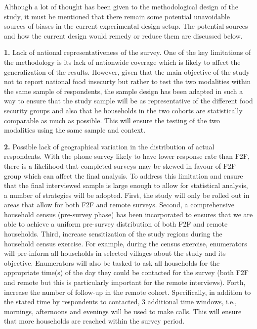 \documentclass[11pt,harvard]{article}
\begin{document}
	Although a lot of thought has been given to the methodological design of the study, it must be mentioned that there remain some potential unavoidable sources of biases in the current experimental design setup. The potential sources and how the current design would remedy or reduce them are discussed below. 
	
	\textbf{1.} Lack of national representativeness of the survey. One of the key limitations of the methodology is its lack of nationwide coverage which is likely to affect the generalization of the results. However, given that the main objective of the study not to report national food insecurty but rather to test the two modalities within the same sample of respondents, the sample design has been adapted in such a way to ensure that the study sample will be as representative of the different food security groups and also that he households in the two cohorts are statistically comparable as much as possible. This will ensure the testing of the two modalities using the same sample and context.
	
	\textbf{2.} Possible lack of geographical variation in the distribution of actual respondents. With the phone survey likely to have lower response rate than F2F, there is a likelihood that completed surveys may be skewed in favour of F2F group which can affect the final analysis. To address this limitation and ensure that the final interviewed sample is large enough to allow for statistical analysis, a number of strategies will be adopted. First, the study will only be rolled out in areas that allow for both F2F and remote surveys. Second, a comprehensive household census (pre-survey phase) has been incorporated to ensures that we are able to achieve a uniform pre-survey distribution of both F2F and remote households. Third, increase sensitization of the study regions during the household census exercise. For example, during the census exercise, enumerators will pre-inform all households in selected villages about the study and its objective. Enumerators will also be tasked to ask all households for the appropriate time(s) of the day they could be contacted for the survey (both F2F and remote but this is particularly important for the remote interviews). Forth, increase the number of follow-up in the remote cohort. Specifically, in addition to the stated time by respondents to contacted, 3 additional time windows, i.e., mornings, afternoons and evenings will be used to make calls. This will ensure that more households are reached within the survey period. 
	
\end{document}
